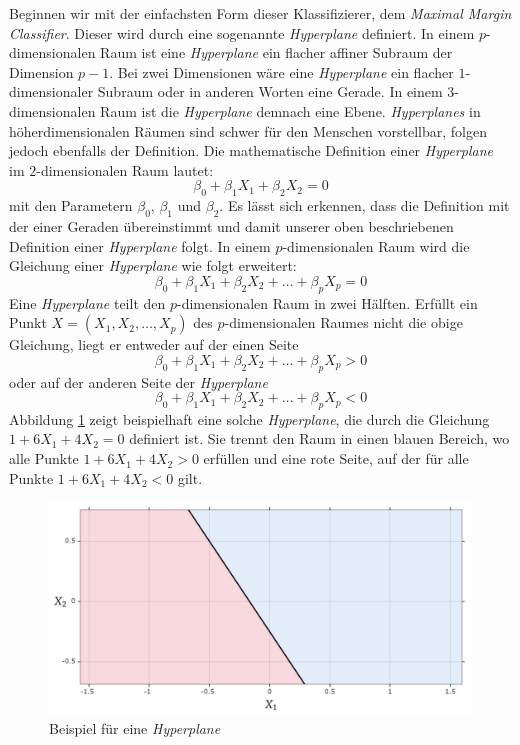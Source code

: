 Beginnen wir mit der einfachsten Form dieser Klassifizierer, dem \textit{Maximal Margin Classifier}. 
Dieser wird durch eine sogenannte \textit{Hyperplane} definiert. In einem $p$-dimensionalen Raum ist eine \textit{Hyperplane}
ein flacher affiner Subraum der Dimension $p - 1$. 
Bei zwei Dimensionen wäre eine \textit{Hyperplane} ein flacher $1$-dimensionaler Subraum oder in anderen Worten eine Gerade.
In einem $3$-dimensionalen Raum ist die \textit{Hyperplane} demnach eine Ebene.
\textit{Hyperplanes} in höherdimensionalen Räumen sind schwer für den Menschen vorstellbar, folgen jedoch ebenfalls der Definition.  
Die mathematische Definition einer \textit{Hyperplane} im $2$-dimensionalen Raum lautet:
\[\beta_0 + \beta_1X_1 + \beta_2X_2 = 0\]
mit den Parametern $\beta_0$, $\beta_1$ und $\beta_2$. 
Es lässt sich erkennen, dass die Definition mit der einer Geraden übereinstimmt und damit unserer oben beschriebenen
Definition einer \textit{Hyperplane} folgt.
In einem $p$-dimensionalen Raum wird die Gleichung einer \textit{Hyperplane} wie folgt erweitert:
\[\beta_0 + \beta_1X_1 + \beta_2X_2  + \dots + \beta_pX_p= 0\]
Eine \textit{Hyperplane} teilt den $p$-dimensionalen Raum in zwei Hälften.
Erfüllt ein Punkt $X = (X_1, X_2, \dots, X_p)$ des $p$-dimensionalen Raumes nicht die obige Gleichung,
liegt er entweder auf der einen Seite
\[\beta_0 + \beta_1X_1 + \beta_2X_2  + \dots + \beta_pX_p> 0\]
oder auf der anderen Seite der \textit{Hyperplane}
\[\beta_0 + \beta_1X_1 + \beta_2X_2  + \dots + \beta_pX_p< 0\]
Abbildung \ref{fig:Hyperplane} zeigt beispielhaft eine solche \textit{Hyperplane}, die durch die Gleichung $1 + 6X_1 + 4X_2 = 0$ definiert ist.
Sie trennt den Raum in einen blauen Bereich, wo alle Punkte $1 + 6X_1 + 4X_2 > 0$ erfüllen und eine rote Seite, auf der für alle Punkte $1 + 6X_1 + 4X_2 < 0$ gilt.
\cite[S. 338]{james_2013}
\begin{figure}[H]
	\centering
	\includegraphics[width=\imgMed]{images/theory/hyperplane.jpg}
	\caption{Beispiel für eine \textit{Hyperplane}} 
	\label{fig:Hyperplane}
\end{figure}

